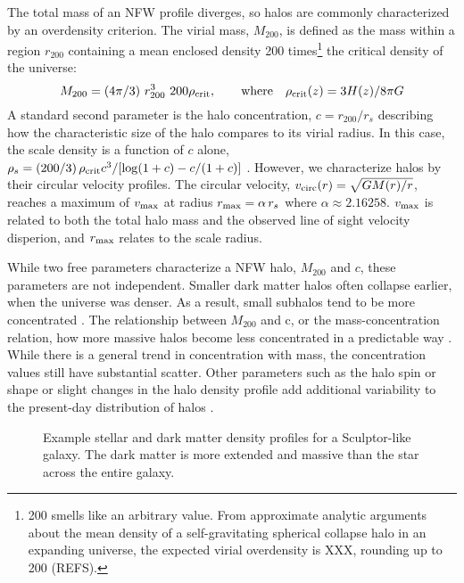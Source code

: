 The total mass of an NFW profile diverges, so halos are commonly
characterized by an overdensity criterion. The virial mass, \(M_{200}\),
is defined as the mass within a region \(r_{200}\) containing a mean
enclosed density 200 times\footnote{200 smells like an arbitrary value.
  From approximate analytic arguments about the mean density of a
  self-gravitating spherical collapse halo in an expanding universe, the
  expected virial overdensity is XXX, rounding up to 200 (REFS).} the
critical density of the universe: \begin{equation}{
M_{200} =(4\pi/3) \ r_{200}^3\ 200\rho_{\rm crit}, \qquad {\rm where} \quad \rho_{\rm crit}(z) = 3H(z) / 8\pi G
}\end{equation} A standard second parameter is the halo concentration,
\(c=r_{200} / r_s\) describing how the characteristic size of the halo
compares to its virial radius. In this case, the scale density is a
function of \(c\) alone,
\(\rho_s = (200/3)\,\rho_{\rm crit} c^3 / [\log(1+c) - c/(1+c)]\)
\citep{NFW1996}. However, we characterize halos by their circular
velocity profiles. The circular velocity,
\(v_{\rm circ}(r) = \sqrt{G M(r) / r}\), reaches a maximum of
\(v_{\rm max}\) at radius \(r_{\rm max} = \alpha\,r_s\) where
\(\alpha\approx2.16258\). \(v_{\rm max}\) is related to both the total
halo mass and the observed line of sight velocity disperion, and
\(r_{\rm max}\) relates to the scale radius.

While two free parameters characterize a NFW halo, \(M_{200}\) and
\(c\), these parameters are not independent. Smaller dark matter halos
often collapse earlier, when the universe was denser. As a result, small
subhalos tend to be more concentrated \citep[e.g.][]{NFW1997}. The
relationship between \(M_{200}\) and c, or the mass-concentration
relation, how more massive halos become less concentrated in a
predictable way \citep[e.g.][\citet{ludlow+2016}]{bullock+2001}. While
there is a general trend in concentration with mass, the concentration
values still have substantial scatter. Other parameters such as the halo
spin or shape or slight changes in the halo density profile add
additional variability to the present-day distribution of halos
\citep[see e.g.][\citet{dutton+maccio2014}, darkEXP,
ect.]{navarro+2010}.

\begin{figure}
\centering
{}
\caption[Example density profiles]{Example stellar and dark matter
density profiles for a Sculptor-like galaxy. The dark matter is more
extended and massive than the star across the entire
galaxy.}\label{fig:nfw_density}
\end{figure}

